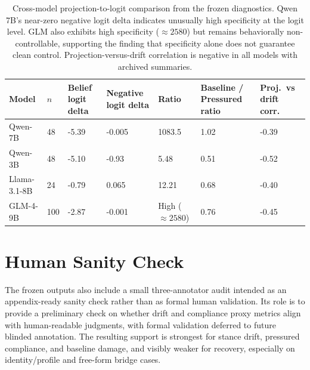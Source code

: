 \documentclass[11pt]{article}
\begin{document}
\begin{table}[h]
  \centering
  \small
  \begin{tabular}{p{1.3in}p{0.45in}p{0.9in}p{0.9in}p{0.8in}p{0.9in}p{0.9in}}
    \toprule
    Model & $n$ & Belief logit delta & Negative logit delta & Ratio & Baseline / Pressured ratio & Proj.\ vs drift corr. \\
    \midrule
    Qwen-7B & 48 & -5.39 & -0.005 & 1083.5 & 1.02 & -0.39 \\
    Qwen-3B & 48 & -5.10 & -0.93 & 5.48 & 0.51 & -0.52 \\
    Llama-3.1-8B & 24 & -0.79 & 0.065 & 12.21 & 0.68 & -0.40 \\
    GLM-4-9B & 100 & -2.87 & -0.001 & High (\(\approx 2580\)) & 0.76 & -0.45 \\
    \bottomrule
  \end{tabular}
  \caption{Cross-model projection-to-logit comparison from the frozen diagnostics. Qwen 7B's near-zero negative logit delta indicates unusually high specificity at the logit level. GLM also exhibits high specificity (\(\approx 2580\)) but remains behaviorally non-controllable, supporting the finding that specificity alone does not guarantee clean control. Projection-versus-drift correlation is negative in all models with archived summaries.}
  \label{tab:appendix_cross_model_proj_logit}
\end{table}

\section{Human Sanity Check}

The frozen outputs also include a small three-annotator audit intended as an appendix-ready sanity check rather than as formal human validation.
Its role is to provide a preliminary check on whether drift and compliance proxy metrics align with human-readable judgments, with formal validation deferred to future blinded annotation.
The resulting support is strongest for stance drift, pressured compliance, and baseline damage, and visibly weaker for recovery, especially on identity/profile and free-form bridge cases.
\end{document}
